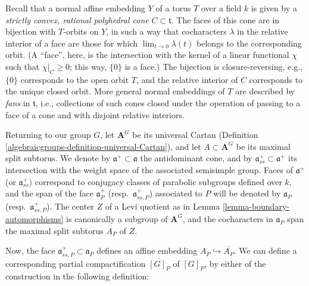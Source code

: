 Recall that a normal affine embedding $Y$ of a torus $T$ over a field $k$ is given by a \emph{strictly convex, rational polyhedral cone} $C\subset \mathfrak t$. The faces of this cone are in bijection with $T$-orbits on $Y$, in such a way that cocharacters $\lambda$ in the relative interior of a face are those for which $\lim_{t\to 0} \lambda(t)$ belongs to the corresponding orbit. (A ``face'', here, is the intersection with the kernel of a linear functional $\chi$ such that $\chi|_C \ge 0$; this way, $\{0\}$ is a face.) The bijection is closure-reversing, e.g., $\{0\}$ corresponds to the open orbit $T$, and the relative interior of $C$ corresponds to the unique closed orbit. More general normal embeddings of $T$ are described by \emph{fans} in $\mathfrak t$, i.e., collections of such cones closed under the operation of passing to a face of a cone and with disjoint relative interiors. 

Returning to our group $G$, let $\mathbf A^G$ be its universal Cartan (Definition \ref{algebraicgroups-definition-universal-Cartan}), and let $A\subset \mathbf A^G$ be its maximal split subtorus. 
We denote by $\mathfrak a^+\subset \mathfrak a$ the antidominant cone, and by $\mathfrak a^+_{ss}\subset \mathfrak a^+$ its intersection with the weight space of the associated semisimple group. Faces of $\mathfrak a^+$ (or $\mathfrak a^+_{ss}$) correspond to conjugacy classes of parabolic subgroups defined over $k$, and the span of the face $\mathfrak a_P^+$ (resp.\ $\mathfrak a_{ss,P}^+$) associated to $P$ will be denoted by $\mathfrak a_P$ (resp.\ $\mathfrak a_{ss,P}^+$). The center $Z$ of a Levi quotient as in Lemma \ref{lemma-boundary-automorphisms} is canonically a subgroup of $\mathbf A^G$, and the cocharacters in $\mathfrak a_P$ span the maximal split subtorus $A_P$ of $Z$.

Now, the face $\mathfrak a_{ss,P}^+\subset \mathfrak a_P$ defines an affine embedding $A_P \hookrightarrow \overline{A_P}$. We can define a corresponding partial compactification $\overline{[G]_P}$ of $[G]_P$, by either of the construction in the following definition:

